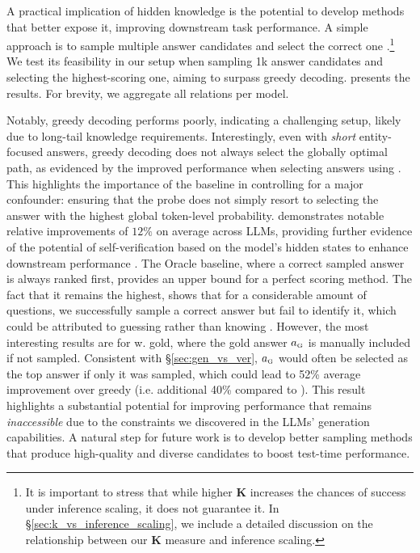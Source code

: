 A practical implication of hidden knowledge is the potential to develop methods that better expose it, improving downstream task performance. A simple approach is to sample multiple answer candidates and select the correct one \citep{brown2024large,hassid2024the,zhao2025sample}.\footnote{It is important to stress that while higher $\mathbf{K}$ increases the chances of success under inference scaling, it does not guarantee it. In \S \ref{sec:k_vs_inference_scaling}, we include a detailed discussion on the relationship between our $\mathbf{K}$ measure and inference scaling.}
We test its feasibility in our setup when sampling 1k answer candidates and selecting the highest-scoring one, aiming to surpass greedy decoding.  presents the results. For brevity, we aggregate all relations per model.



Notably, greedy decoding performs poorly, indicating a challenging setup, likely due to long-tail knowledge requirements. Interestingly, even with \textit{short} entity-focused answers, greedy decoding does not always select the globally optimal path, as evidenced by the improved performance when selecting answers using \baselineA. This highlights the importance of the \baselineA baseline in controlling for a major confounder: ensuring that the probe does not simply resort to selecting the answer with the highest global token-level probability. 
\baselineD demonstrates
notable relative improvements of $12\%$ on average across LLMs, providing further evidence of the potential of self-verification based on the model's hidden states to enhance downstream performance \citep{orgad2024llms}. The Oracle baseline, where a correct sampled answer is always ranked first, provides an upper bound for a perfect scoring method. The fact that it remains the highest, shows that for a considerable amount of questions, we successfully sample a correct answer but fail to identify it, which could be attributed to guessing rather than knowing \citep{yona2024keep}.
However, the most interesting results are for \baselineD w. gold, where the gold answer $a_{\text{\tiny G}}$ is manually included if not sampled. Consistent with \S \ref{sec:gen_vs_ver}, $a_{\text{\tiny G}}$ would often be selected as the top answer if only it was sampled, which could lead to 52\% average improvement over greedy (i.e. additional 40\% compared to \baselineD).
This result highlights a substantial potential for improving performance that remains \textit{inaccessible} due to the constraints we discovered in the LLMs' generation capabilities. A natural step for future work is to develop better sampling methods that produce high-quality and diverse candidates to boost test-time performance.



